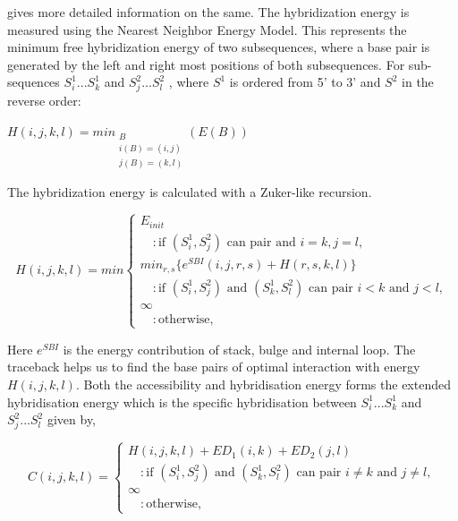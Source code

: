\documentclass[twoside,a4paper]{report}
\numberwithin{equation}{section}
\begin{document}
	\citet{muckstein2006thermodynamics} gives more detailed information on the same.
	The hybridization energy is measured using the Nearest Neighbor Energy Model. This represents the minimum free hybridization energy  of two subsequences, where a base pair is generated by the left and right most positions of both subsequences.
	For sub-sequences $S_i^1...S_k^1$ and  $S_j^2...S_l^2$ , where $S^1$ is ordered from 5' to 3' and $S^2$ in the reverse order:

%	
		\begin{center}
		
		
		$H(i,j,k,l) = min_{\substack{B \\ i(B) = (i,j) \\ j(B) =(k,l)}}( E(B) )   $
		
	\end{center}
	
	The hybridization energy is calculated with a Zuker-like recursion.
	
	\begin{equation}
	\label{eq:equ12}
	H(i,j,k,l) = min \begin{cases}
	E_{init} \\
		\quad : \text{if $(S_i^1 , S_j^2 )$ can pair and $i =k , j=l $}, \\	
	min_{r,s}\{ e^{SBI}(i,j,r,s)+ H(r,s,k,l)\} \\
	 \quad 	: \text{if $(S_i^1 , S_j^2 )$ and $(S_k^1 , S_l^2)$ can pair $i < k $ and $j < l $} ,\\
	\infty \\
	\quad : \text{otherwise},
	\end{cases}
	\end{equation}
	
	Here $e^{SBI} $ is the energy contribution of stack, bulge and internal loop. The traceback helps us to find the base pairs of optimal interaction with energy $H(i,j,k,l)$. Both the accessibility and hybridisation energy forms the extended hybridisation energy which is the specific hybridisation between $S_i^1...S_k^1$ and  $S_j^2...S_l^2$ given by, 
	
		\begin{equation}
	C(i,j,k,l) =  \begin{cases}
	H(i, j, k , l) + ED_1(i, k) + ED_2(j, l) \\
	\quad 	: \text{if $(S_i^1 , S_j^2 )$ and $(S_k^1 , S_l^2)$ can pair $i \neq k $ and $j \neq l $} ,\\
	\infty \\
	\quad : \text{otherwise},
	\end{cases}
	\end{equation}
	
\end{document}
